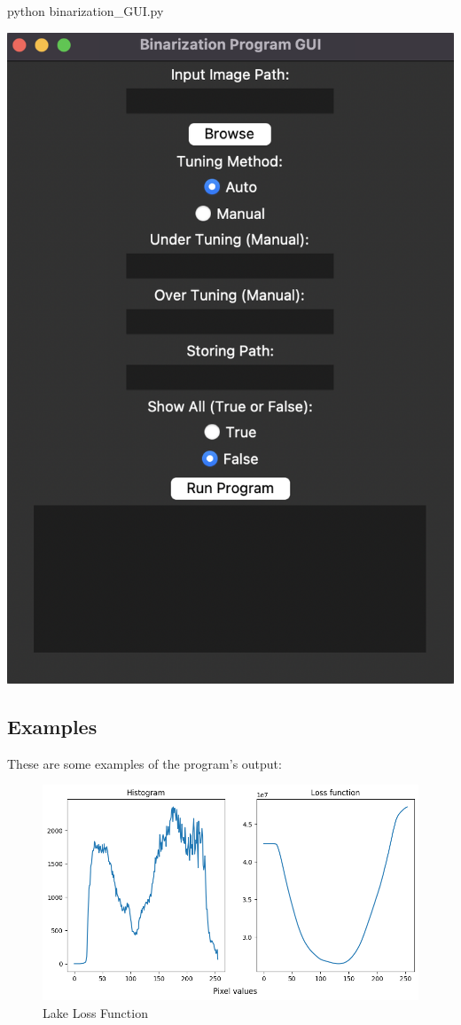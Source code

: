 \begin{bashscript}
    python binarization\_GUI.py
\end{bashscript}

\includegraphics[scale=0.6]{../Images/examples/GUI.png}

\subsection{Examples}

These are some examples of the program's output:

\begin{figure}[h]
    \centering
    \includegraphics[width=0.6\columnwidth]{../Images/examples/lake_loss.png}
    \caption{Lake Loss Function}
    \label{fig-1}
\end{figure}


